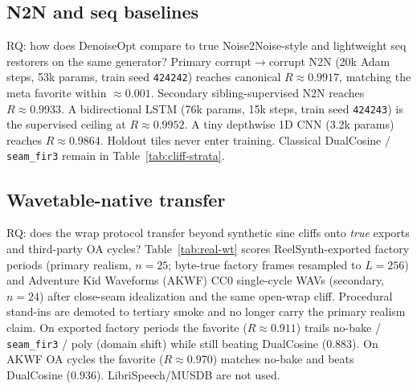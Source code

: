 \subsection{N2N and seq baselines}
\label{sec:n2n-baselines}

RQ: how does DenoiseOpt compare to true Noise2Noise-style and lightweight seq restorers on the same generator?
Primary corrupt$\to$corrupt N2N (20k Adam steps, 53k params, train seed \texttt{424242}) reaches canonical $R\approx 0.9917$, matching the meta favorite within $\approx 0.001$.
Secondary sibling-supervised N2N reaches $R\approx 0.9933$.
A bidirectional LSTM (76k params, 15k steps, train seed \texttt{424243}) is the supervised ceiling at $R\approx 0.9952$.
A tiny depthwise 1D CNN (3.2k params) reaches $R\approx 0.9864$.
Holdout tiles never enter training.
Classical DualCosine / \texttt{seam\_fir3} remain in Table~\ref{tab:cliff-strata}.

\subsection{Wavetable-native transfer}
\label{sec:real-wt}

RQ: does the wrap protocol transfer beyond synthetic sine cliffs onto \emph{true} exports and third-party OA cycles?
Table~\ref{tab:real-wt} scores ReelSynth-exported factory periods (primary realism, $n{=}25$; byte-true factory frames resampled to $L{=}256$) and Adventure Kid Waveforms (AKWF) CC0 single-cycle WAVs (secondary, $n{=}24$) after close-seam idealization and the same open-wrap cliff.
Procedural stand-ins are demoted to tertiary smoke and no longer carry the primary realism claim.
On exported factory periods the favorite ($R\approx 0.911$) trails no-bake / \texttt{seam\_fir3} / poly (domain shift) while still beating DualCosine ($0.883$).
On AKWF OA cycles the favorite ($R\approx 0.970$) matches no-bake and beats DualCosine ($0.936$).
LibriSpeech/MUSDB are not used.

